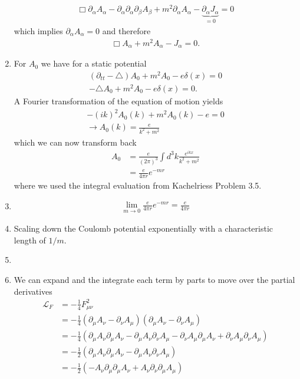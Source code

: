 \documentclass[10pt,a4paper]{article}
\theoremstyle{definition}
\begin{document}
\begin{enumerate}[label=(\alph*)]
\begin{align}
    \Box \partial_\alpha A_\alpha-\partial_\alpha\partial_\alpha\partial_\beta A_\beta+m^2\partial_\alpha A_\alpha-\underbrace{\partial_\alpha J_\alpha}_{=0}=0
\end{align}
which implies $\partial_\alpha A_\alpha=0$ and therefore
\begin{align}
    \Box A_\alpha+m^2A_\alpha-J_\alpha=0.
\end{align}
\item For $A_0$ we have for a static potential
\begin{align}
    (\partial_{tt}-\triangle)A_0+m^2A_0-e\delta(x)=0\\
    -\triangle A_0+m^2A_0-e\delta(x)=0.
\end{align}
A Fourier transformation of the equation of motion yields
\begin{align}
    -(ik)^2 A_0(k)+m^2A_0(k)-e=0\\
    \rightarrow A_0(k)=\frac{e}{k^2+m^2}
\end{align}
which we can now transform back 
\begin{align}
    A_0
    &=\frac{e}{(2\pi)^3}\int d^3k\frac{e^{ikx}}{k^2+m^2}\\
    &=\frac{e}{4\pi r} e^{-mr}
\end{align}
where we used the integral evaluation from {\sc Kachelriess} Problem 3.5.
\item 
\begin{align}
    \lim_{m\rightarrow0}\frac{e}{4\pi r} e^{-mr}=\frac{e}{4\pi r}
\end{align}
\item Scaling down the Coulomb potential exponentially with a characteristic length of $1/m$.
\item
\item We can expand and the integrate each term by parts to move over the partial derivatives 
\begin{align}
    \mathscr{L}_F
    &=-\frac{1}{4}F_{\mu\nu}^2\\
    &=-\frac{1}{4}(\partial_\mu A_\nu-\partial_\nu A_\mu)(\partial_\mu A_\nu-\partial_\nu A_\mu)\\
    &=-\frac{1}{4}\left(\partial_\mu A_\nu \partial_\mu A_\nu-\partial_\mu A_\nu \partial_\nu A_\mu
        -\partial_\nu A_\mu \partial_\mu A_\nu + \partial_\nu A_\mu\partial_\nu A_\mu\right)\\
    &=-\frac{1}{2}\left(\partial_\mu A_\nu \partial_\mu A_\nu-\partial_\mu A_\nu \partial_\nu A_\mu\right)\\
    &=-\frac{1}{2}\left(-A_\nu\partial_\mu\partial_\mu A_\nu+ A_\nu \partial_\nu \partial_\mu A_\mu\right)\\

\end{align}
\end{enumerate}
\end{document}
